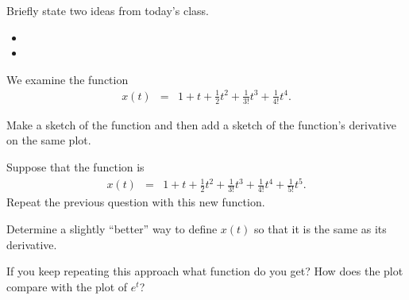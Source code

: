 \postClass

\begin{problem}
\item Briefly state two ideas from today's class.
  \begin{itemize}
  \item
  \item
  \end{itemize}
\item We examine the function
  \begin{eqnarray*}
    x(t) & = & 1 + t + \frac{1}{2} t^2 + \frac{1}{3!} t^3 + \frac{1}{4!} t^4.
  \end{eqnarray*}
  \begin{subproblem}
  \item Make a sketch of the function and then add a sketch of the
    function's derivative on the same plot.
    \vfill
  \item Suppose that the function is
    \begin{eqnarray*}
      x(t) & = & 1 + t + \frac{1}{2} t^2 + \frac{1}{3!} t^3 +
                 \frac{1}{4!} t^4 + \frac{1}{5!} t^5.
    \end{eqnarray*}
    Repeat the previous question with this new function.
    \vfill

    \clearpage
  \item Determine a slightly ``better'' way to define $x(t)$ so that
    it is the same as its derivative.
    \vfill

  \item If you keep repeating this approach what function do you get?
    How does the plot compare with the plot of $e^t$?
    \vspace{2em}
  \end{subproblem}
\end{problem}


